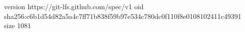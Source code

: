 version https://git-lfs.github.com/spec/v1
oid sha256:c6b1d54d82a5a4c7ff71b838f59b97e534c780dc0f110f8e0108102411c49391
size 1081
